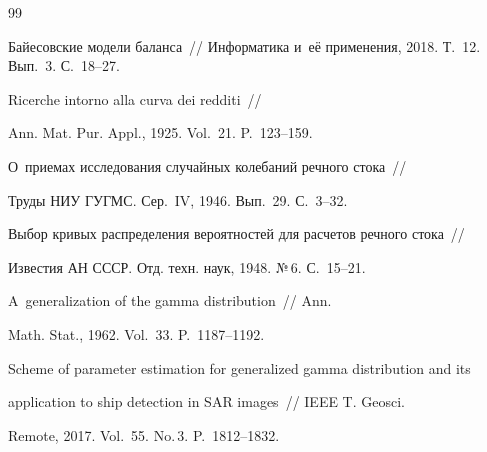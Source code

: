 {{\begin{thebibliography}{99}




Байесовские модели баланса~/\!\!/ Информатика и~её применения, 2018. Т.~12. Вып.~3. С.~18--27.









Ricerche intorno alla curva dei redditi~/\!\!/ 




Ann. Mat. Pur. Appl., 1925. Vol.~21. P.~123--159.









О~приемах исследования случайных колебаний речного стока~/\!\!/ 


Труды НИУ ГУГМС. Сер.~IV, 1946. Вып.~29. С.~3--32.











Выбор кривых распределения вероятностей для расчетов речного стока~/\!\!/ 


Известия АН СССР. Отд. техн. наук, 1948. №\,6. С.~15--21.









A~generalization of the gamma distribution~/\!\!/ Ann. 


Math. Stat., 1962. Vol.~33. P.~1187--1192.









Scheme of parameter estimation for generalized gamma distribution and its 


application to ship detection in SAR images~/\!\!/ IEEE T. Geosci. 


Remote, 2017. Vol.~55. No.\,3.  P.~1812--1832.






\end{thebibliography}}}

